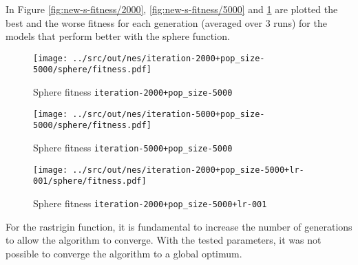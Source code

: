 In Figure \ref{fig:new-s-fitness/2000}, \ref{fig:new-s-fitness/5000} and \ref{fig:new-s-fitness/lr} are plotted the best and the worse fitness for each generation (averaged over 3 runs) for the models that perform better with the sphere function.

 \begin{figure}[H]
	\centering
	\begin{minipage}[b]{.6\textwidth}
		\texttt{[image: ../src/out/nes/iteration-2000+pop\_size-5000/sphere/fitness.pdf]}	
	\end{minipage}
	\caption{Sphere fitness \texttt{iteration-2000+pop\_size-5000}}
	\label{fig:new-s-fitness/2000}
	
	\begin{minipage}[b]{.6\textwidth}
		\texttt{[image: ../src/out/nes/iteration-5000+pop\_size-5000/sphere/fitness.pdf]}	
	\end{minipage}
	\caption{Sphere fitness \texttt{iteration-5000+pop\_size-5000}}
	\label{fig:new-s-fitness/5000}

	\begin{minipage}[b]{.6\textwidth}
		\texttt{[image: ../src/out/nes/iteration-2000+pop\_size-5000+lr-001/sphere/fitness.pdf]}	
	\end{minipage}
	\caption{Sphere fitness \texttt{iteration-2000+pop\_size-5000+lr-001}}
	\label{fig:new-s-fitness/lr}
\end{figure}

For the rastrigin function, it is fundamental to increase the number of generations to allow the algorithm to converge.
With the tested parameters, it was not possible to converge the algorithm to a global optimum.

